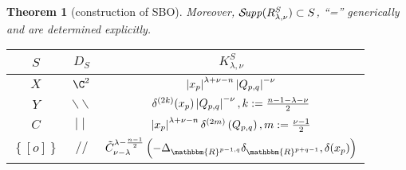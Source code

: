 \documentclass[portrait,final,paperwidth=90cm,paperheight=120cm,fontscale=0.3]{baposter}
\newcommand{\tmop}[1]{\ensuremath{\operatorname{#1}}}
\newcommand{\mybox}[2]{
	\begin{tcolorbox}[colback=green!5,colframe=green!40!black,title=#1]#2\end{tcolorbox}
}
\newtheorem{theorem}{Theorem}
\newcommand{\Supp}{\mathcal{S}\!{\it upp}}
\theoremstyle{definition}
\renewcommand{\Q}{Q_{p,q}}
\newcommand{\mm}{\mid\mid}
\newcommand{\bb}{\backslash\backslash}
\renewcommand{\ss}{//}
\begin{document}
\begin{poster}
{\begin{theorem}[construction of SBO]
	Moreover, $\Supp(R_{\lambda,\nu}^S)\subset S$, ``='' generically and are determined explicitly.\\\vspace{-0.3cm}
	\mybox{{Example: Support of $\tilde{R}^X_{\lambda,\nu}$ for $(p,q)=(2,3)$}}
	{
		\begin{center}
		\vspace{-0.5cm}
		\begin{figure}[H]
			\centering
		
		\end{figure}
		\vspace{-1cm}
		\end{center}
	}
	\vspace{-0.3cm}
	\begin{center}
	\begin{tabular}{@{}|@{}c@{}|c|@{}c@{}|}
  \hline
  $S$ & $D_S$ & $K_{\lambda,\nu}^S$ \\
  \hline
  $X$ & $\C^2$ & $\myabs{x_p}^{\lambda+\nu-n}\myabs{\Q}^{-\nu}$ \\
  \hline
  $Y$ & $\bb$ & $\delta^{\left( 2k \right)}(x_p)\myabs{\Q}^{-\nu},k:=\frac{n-1-\lambda-\nu}{2}$ \\
  \hline
  $C$ & $\mm$ & $\myabs{x_p}^{\lambda+\nu-n}\delta^{(2m)}\left( \Q \right),m:=\frac{\nu-1}{2}$ \\
  \hline
  $\left\{ [o] \right\}$ & $\ss$ & $\tilde{C}_{\nu -
  \lambda}^{\lambda - \frac{n - 1}{2}} \left(-\Delta_{\mathbbm{R}^{p - 1, q}}
  \delta_{\mathbbm{R}^{p + q - 1}}, \delta (x_p)\right)$\\ \hline

\end{tabular}
\end{center}
\end{theorem}}
\end{poster}
\end{document}
